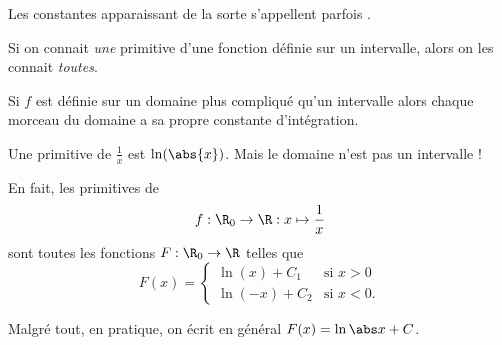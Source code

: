 \begin{frame}
  \begin{definition}
    Les constantes apparaissant de la sorte s'appellent parfois .
  \end{definition}
  \begin{remark}
    Si on connait \emph{une} primitive d'une fonction définie sur un intervalle, alors on les connait \emph{toutes}.
  \end{remark}
  \end{frame}
  \begin{frame}
\begin{remark*}
    Si $f$ est définie sur un domaine plus compliqué qu'un intervalle alors chaque \og morceau\fg{} du domaine a sa propre constante d'intégration.
  \end{remark*}

  \begin{example}
    Une primitive de \(\frac{1}{x}\) est \(\ln(\abs{x})\).\pause{} Mais le domaine n'est pas un intervalle !

    En fait, les primitives de
    \begin{equation*}
      f : \R_0 \to \R : x \mapsto \frac{1}{x}
    \end{equation*}\pause{}
    sont toutes les fonctions $F : \R_0 \to \R$ telles que\pause{}
    \begin{equation*}
      F(x) =
      \begin{cases}
        \ln(x) + C_1 &\textrm{si } x > 0\\
        \ln(-x) + C_2 &\textrm{si } x < 0.
      \end{cases}
    \end{equation*}\pause{}

    Malgré tout, en pratique, on écrit en général \(F(x) = \ln\abs x + C\).
  \end{example}
\end{frame}

